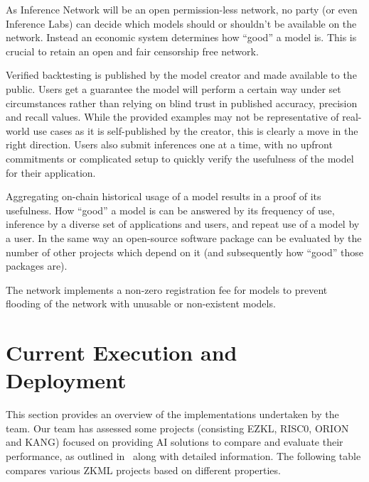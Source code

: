\documentclass[conference]{IEEEtran}
\begin{document}
As Inference Network will be an open permission-less network, no party (or even Inference Labs) can decide which models should or shouldn’t be available on the network. Instead an economic system determines how “good” a model is. This is crucial to retain an open and fair censorship free network.

Verified backtesting is published by the model creator and made available to the public. Users get a guarantee the model will perform a certain way under set circumstances rather than relying on blind trust in published accuracy, precision and recall values. While the provided examples may not be representative of real-world use cases as it is self-published by the creator, this is clearly a move in the right direction. Users also submit inferences one at a time, with no upfront commitments or complicated setup to quickly verify the usefulness of the model for their application.

Aggregating on-chain historical usage of a model results in a proof of its usefulness. How “good” a model is can be answered by its frequency of use, inference by a diverse set of applications and users, and repeat use of a model by a user. In the same way an open-source software package can be evaluated by the number of other projects which depend on it (and subsequently how “good” those packages are).

The network implements a non-zero registration fee for models to prevent flooding of the network with unusable or non-existent models.


\section{Current Execution and Deployment}

This section provides an overview of the implementations undertaken by the team. Our team has assessed some projects (consisting EZKL, RISC0, ORION and KANG) focused on providing AI solutions to compare and evaluate their performance, as outlined in~\cite{BrainbenchXYZ} along with detailed information. The following table compares various ZKML projects based on different properties.
\end{document}
